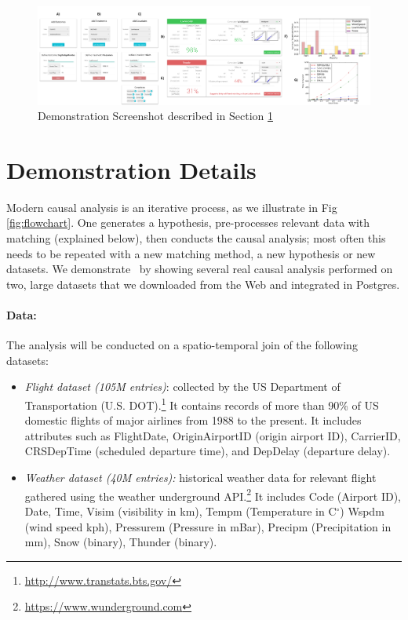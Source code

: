 \begin{figure}
\centering
\includegraphics[scale=0.13]{Figures/Demo-Tutorial-2.png}
\caption{Demonstration Screenshot described in Section  \ref{sec:dd}}
\label{sfig:demo-tutorial}
\end{figure}


\section{Demonstration Details}
\label{sec:dd}
Modern causal analysis is an iterative process, as we illustrate in Fig \ref{fig:flowchart}.
One generates a hypothesis, pre-processes  relevant data with matching (explained below),
  then conducts the causal analysis; most often this needs to be repeated with a new matching
  method, a new hypothesis or  new datasets.
We demonstrate \GSQL\ by showing several real causal analysis performed on two,
  large datasets that we downloaded from the Web and integrated in Postgres.


    \paragraph{\bf Data:} The analysis will be conducted on a spatio-temporal join of the following datasets:
 \begin{itemize}
   \item {\it Flight dataset (105M entries)}: collected by the US
Department of Transportation (U.S. DOT).\footnote{\url{http://www.transtats.bts.gov/}} It contains
records of more than 90\% of US domestic flights of major airlines
from 1988 to the present. It includes attributes such as FlightDate, OriginAirportID (origin airport ID), CarrierID, CRSDepTime (scheduled departure time), and DepDelay (departure delay).
   \item {\it Weather dataset (40M entries):} historical weather data for relevant flight gathered using the weather underground API.\footnote{\url{https://www.wunderground.com}} It includes Code (Airport ID),
Date, Time,  Visim (visibility in km),
  Tempm (Temperature in C$^{\circ}$)
  Wspdm (wind speed kph), Pressurem (Pressure in mBar), Precipm  (Precipitation in mm), Snow (binary), Thunder (binary).
 \end{itemize}





